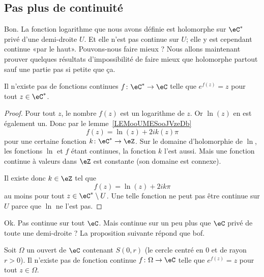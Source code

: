 \subsection{Pas plus de continuité}

Bon. La fonction logarithme que nous avons définie est holomorphe sur \( \eC^*\) privé d'une demi-droite \( U\). Et elle n'est pas continue sur \( U\); elle y est cependant continue «par le haut». Pouvons-nous faire mieux ? Nous allons maintenant prouver quelques résultats d'impossibilité de faire mieux que holomorphe partout sauf une partie pas si petite que ça.

\begin{proposition}
	Il n'existe pas de fonctions continues \( f\colon \eC^*\to \eC\) telle que \(  e^{f(z)}=z\) pour tout \( z\in \eC^*\).
\end{proposition}

\begin{proof}
	Pour tout \( z\), le nombre \( f(z)\) est un logarithme de \( z\). Or \( \ln(z)\) en est également un. Donc par le lemme~\ref{LEMooUMESooJVzeDb}
	\begin{equation}
		f(z)=\ln(z)+2i k(z)\pi
	\end{equation}
	pour une certaine fonction \( k\colon \eC^*\to \eZ\). Sur le domaine d'holomorphie de \( \ln\), les fonctions \( \ln\) et \( f\) étant continues, la fonction \( k\) l'est aussi. Mais une fonction continue à valeurs dans \( \eZ\) est constante (son domaine est connexe).

	Il existe donc \( k\in \eZ\) tel que
	\begin{equation}
		f(z)=\ln(z)+2ik\pi
	\end{equation}
	au moins pour tout \( z\in \eC^*\setminus U\). Une telle fonction ne peut pas être continue sur \( U\) parce que \( \ln\) ne l'est pas.
\end{proof}

Ok. Pas continue sur tout \( \eC\). Mais continue sur un peu plus que \( \eC\) privé de toute une demi-droite ? La proposition suivante répond que bof.

\begin{proposition}
	Soit \( \Omega\) un ouvert de \( \eC\) contenant \( S(0,r)\) (le cercle centré en \( 0\) et de rayon \( r>0\)). Il n'existe pas de fonction continue \( f\colon \Omega\to \eC\) telle que \(  e^{f(z)}=z\) pour tout \( z\in \Omega\).
\end{proposition}

